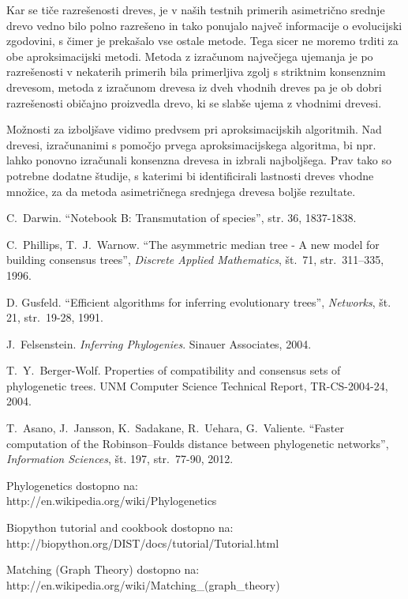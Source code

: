 \documentclass[a4paper, 12pt]{book}
\begin{document}
Kar se tiče razrešenosti dreves, je v naših testnih primerih asimetrično srednje drevo vedno bilo polno razrešeno in tako ponujalo največ informacije o evolucijski zgodovini, s čimer je prekašalo vse ostale metode. Tega sicer ne moremo trditi za obe aproksimacijski metodi. Metoda z izračunom največjega ujemanja je po razrešenosti v nekaterih primerih bila primerljiva zgolj s striktnim konsenznim drevesom, metoda z izračunom drevesa iz dveh vhodnih dreves pa je ob dobri razrešenosti običajno proizvedla drevo, ki se slabše ujema z vhodnimi drevesi.

Možnosti za izboljšave vidimo predvsem pri aproksimacijskih algoritmih. Nad drevesi, izračunanimi s pomočjo prvega aproksimacijskega algoritma, bi npr. lahko ponovno izračunali konsenzna drevesa in izbrali najboljšega. Prav tako so potrebne dodatne študije, s katerimi bi identificirali lastnosti dreves vhodne množice, za da metoda asimetričnega srednjega drevesa boljše rezultate.


\begin{thebibliography}{99}

C.\ Darwin. ``Notebook B: Transmutation of species'', str. 36, 1837-1838.

C.\ Phillips, T.\ J.\ Warnow. ``The asymmetric median tree - A new model for building consensus trees'', {\it Discrete Applied Mathematics}, št.\ 71, str.\ 311–335, 1996.

D. Gusfeld. ``Efficient algorithms for inferring evolutionary trees'', {\it Networks}, št. 21, str.\ 19-28, 1991.

J.\ Felsenstein. \textit{Inferring Phylogenies}. Sinauer Associates, 2004.

T.\ Y.\ Berger-Wolf. Properties of compatibility and consensus sets of phylogenetic trees. UNM Computer Science Technical Report, TR-CS-2004-24, 2004.

T.\ Asano, J.\ Jansson, K.\ Sadakane, R.\ Uehara, G.\ Valiente. ``Faster computation of the Robinson–Foulds distance between phylogenetic networks'', {\it Information Sciences}, št. 197, str.\ 77-90, 2012.

Phylogenetics
dostopno na:\\ http://en.wikipedia.org/wiki/Phylogenetics

Biopython tutorial and cookbook
dostopno na: \\ http://biopython.org/DIST/docs/tutorial/Tutorial.html

Matching (Graph Theory)
dostopno na: \\ http://en.wikipedia.org/wiki/Matching\_(graph\_theory)


\end{thebibliography}
\end{document}
